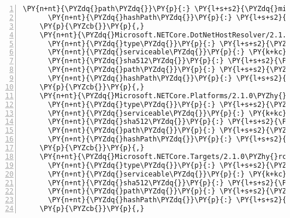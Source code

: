 \begin{Verbatim}[commandchars=\\\{\},numbers=left,firstnumber=1,stepnumber=1,numberblanklines=0]
      \PY{n+nt}{\PYZdq{}path\PYZdq{}}\PY{p}{:} \PY{l+s+s2}{\PYZdq{}microsoft.netcore.dotnethostpolicy/2.1.0\PYZhy{}rc1\PYZdq{}}\PY{p}{,}
      \PY{n+nt}{\PYZdq{}hashPath\PYZdq{}}\PY{p}{:} \PY{l+s+s2}{\PYZdq{}microsoft.netcore.dotnethostpolicy.2.1.0\PYZhy{}rc1.nupkg.sha512\PYZdq{}}
    \PY{p}{\PYZcb{}}\PY{p}{,}
    \PY{n+nt}{\PYZdq{}Microsoft.NETCore.DotNetHostResolver/2.1.0\PYZhy{}rc1\PYZdq{}}\PY{p}{:} \PY{p}{\PYZob{}}
      \PY{n+nt}{\PYZdq{}type\PYZdq{}}\PY{p}{:} \PY{l+s+s2}{\PYZdq{}package\PYZdq{}}\PY{p}{,}
      \PY{n+nt}{\PYZdq{}serviceable\PYZdq{}}\PY{p}{:} \PY{k+kc}{true}\PY{p}{,}
      \PY{n+nt}{\PYZdq{}sha512\PYZdq{}}\PY{p}{:} \PY{l+s+s2}{\PYZdq{}sha512\PYZhy{}0desKuiIjUpcgmO1ViGKLTyhhO+CIRwN1Po/2DDQh9fHkXkxCHPKnZOKFjYMJSHohsliotAC99wZqYs9sKZkdQ==\PYZdq{}}\PY{p}{,}
      \PY{n+nt}{\PYZdq{}path\PYZdq{}}\PY{p}{:} \PY{l+s+s2}{\PYZdq{}microsoft.netcore.dotnethostresolver/2.1.0\PYZhy{}rc1\PYZdq{}}\PY{p}{,}
      \PY{n+nt}{\PYZdq{}hashPath\PYZdq{}}\PY{p}{:} \PY{l+s+s2}{\PYZdq{}microsoft.netcore.dotnethostresolver.2.1.0\PYZhy{}rc1.nupkg.sha512\PYZdq{}}
    \PY{p}{\PYZcb{}}\PY{p}{,}
    \PY{n+nt}{\PYZdq{}Microsoft.NETCore.Platforms/2.1.0\PYZhy{}rc1\PYZdq{}}\PY{p}{:} \PY{p}{\PYZob{}}
      \PY{n+nt}{\PYZdq{}type\PYZdq{}}\PY{p}{:} \PY{l+s+s2}{\PYZdq{}package\PYZdq{}}\PY{p}{,}
      \PY{n+nt}{\PYZdq{}serviceable\PYZdq{}}\PY{p}{:} \PY{k+kc}{true}\PY{p}{,}
      \PY{n+nt}{\PYZdq{}sha512\PYZdq{}}\PY{p}{:} \PY{l+s+s2}{\PYZdq{}sha512\PYZhy{}nsme5QrPBS8qq1FLFwbhhyOPMcQjhWd0pXCEIAnmtTacLdZZ+w54QiP7OaibGEyDdyhL/42ixsazNuP0irPKNw==\PYZdq{}}\PY{p}{,}
      \PY{n+nt}{\PYZdq{}path\PYZdq{}}\PY{p}{:} \PY{l+s+s2}{\PYZdq{}microsoft.netcore.platforms/2.1.0\PYZhy{}rc1\PYZdq{}}\PY{p}{,}
      \PY{n+nt}{\PYZdq{}hashPath\PYZdq{}}\PY{p}{:} \PY{l+s+s2}{\PYZdq{}microsoft.netcore.platforms.2.1.0\PYZhy{}rc1.nupkg.sha512\PYZdq{}}
    \PY{p}{\PYZcb{}}\PY{p}{,}
    \PY{n+nt}{\PYZdq{}Microsoft.NETCore.Targets/2.1.0\PYZhy{}rc1\PYZdq{}}\PY{p}{:} \PY{p}{\PYZob{}}
      \PY{n+nt}{\PYZdq{}type\PYZdq{}}\PY{p}{:} \PY{l+s+s2}{\PYZdq{}package\PYZdq{}}\PY{p}{,}
      \PY{n+nt}{\PYZdq{}serviceable\PYZdq{}}\PY{p}{:} \PY{k+kc}{true}\PY{p}{,}
      \PY{n+nt}{\PYZdq{}sha512\PYZdq{}}\PY{p}{:} \PY{l+s+s2}{\PYZdq{}sha512\PYZhy{}TmcnvHJlhTifhcw0C9ey85ag9xnRi4BLOZePCqfUnO3MS78ifKGBInIfQZxgKvGLjGhvwib4HCbagEtvQR2cEw==\PYZdq{}}\PY{p}{,}
      \PY{n+nt}{\PYZdq{}path\PYZdq{}}\PY{p}{:} \PY{l+s+s2}{\PYZdq{}microsoft.netcore.targets/2.1.0\PYZhy{}rc1\PYZdq{}}\PY{p}{,}
      \PY{n+nt}{\PYZdq{}hashPath\PYZdq{}}\PY{p}{:} \PY{l+s+s2}{\PYZdq{}microsoft.netcore.targets.2.1.0\PYZhy{}rc1.nupkg.sha512\PYZdq{}}
    \PY{p}{\PYZcb{}}\PY{p}{,}

\end{Verbatim}
